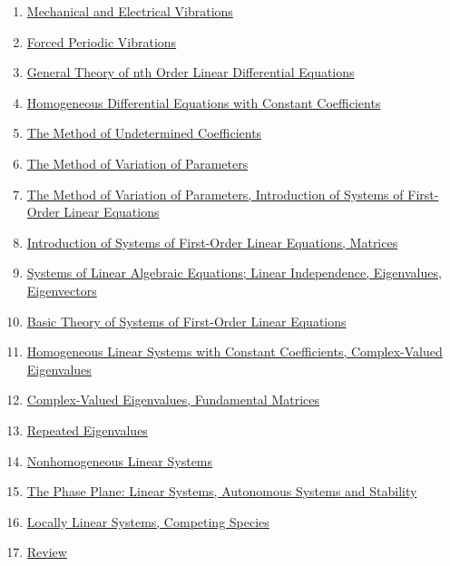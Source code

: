 \documentclass[11pt]{article}
\begin{document}
\begin{enumerate}
	\item \href{https://mp.weixin.qq.com/s/LwPuxNsmFBt72K9LxnhS9A}{Mechanical and Electrical Vibrations}	%
	\item \href{https://mp.weixin.qq.com/s/Az393GVoBW2kFlWpGQ5Yhw}{Forced Periodic Vibrations}	%
	\item \href{https://mp.weixin.qq.com/s/6nBdW5hJEhpDoNdaRZo3dg}{General Theory of nth Order Linear Differential Equations}	%
	\item \href{https://mp.weixin.qq.com/s/8RLdXjS5vOJcJy4VHMQNqg}{Homogeneous Differential Equations with Constant Coefficients}	%
	\item \href{https://mp.weixin.qq.com/s/ig9chsWihiu5nnRDI4w8mA}{The Method of Undetermined Coefficients}	%
	\item \href{https://mp.weixin.qq.com/s/H8Gu974XJSotjJWoVcXnjA}{The Method of Variation of Parameters}	%
	\item \href{https://mp.weixin.qq.com/s/BwPopvS2TkhVzyoW2kQUNg}{The Method of Variation of Parameters, Introduction of Systems of First-Order Linear Equations}	%
	\item \href{https://mp.weixin.qq.com/s/dQkylpxK_eP7Sk2KOe74Yg}{Introduction of Systems of First-Order Linear Equations, Matrices}	%
	\item \href{https://mp.weixin.qq.com/s/HoVYSp_ycClZlexRFI2sYA}{Systems of Linear Algebraic Equations; Linear Independence, Eigenvalues, Eigenvectors}	%
	\item \href{https://mp.weixin.qq.com/s/VmPcHgr27qxX0iWoDrJGWw}{Basic Theory of Systems of First-Order Linear Equations}	%
	\item \href{https://mp.weixin.qq.com/s/KhGmRhFJf-ICB2O93dmwbA}{Homogeneous Linear Systems with Constant Coefficients, Complex-Valued Eigenvalues}	%
	\item \href{https://mp.weixin.qq.com/s/hxJGOEAT23cx-UA2Nq140w}{Complex-Valued Eigenvalues, Fundamental Matrices}	%
	\item \href{https://mp.weixin.qq.com/s/kVbbXAP8eCSiO0N8s4ZTRQ}{Repeated Eigenvalues}	%
	\item \href{https://mp.weixin.qq.com/s/B6M3uO7wzwy2ihiT91CsJA}{Nonhomogeneous Linear Systems}	%
	\item \href{https://mp.weixin.qq.com/s/coKI1j0Gw6fYxsbpTfISpA}{The Phase Plane: Linear Systems, Autonomous Systems and Stability}	%
	\item \href{https://mp.weixin.qq.com/s/dC3HiIyYYE-yjo3kmvlS7A}{Locally Linear Systems, Competing Species}	%
	\item \href{https://mp.weixin.qq.com/s/A4W1a5vrcnODQf-Et3p9SA}{Review}	%

\end{enumerate}
\end{document}
